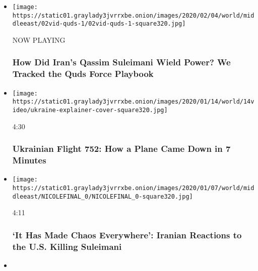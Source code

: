 \begin{itemize}
\item
  \texttt{[image: https://static01.graylady3jvrrxbe.onion/images/2020/02/04/world/middleeast/02vid-quds-1/02vid-quds-1-square320.jpg]}

  NOW PLAYING

  \hypertarget{how-did-irans-qassim-suleimani-wield-power-we-tracked-the-quds-force-playbook-2}{%
  \subsubsection{How Did Iran's Qassim Suleimani Wield Power? We Tracked
  the Quds Force
  Playbook}\label{how-did-irans-qassim-suleimani-wield-power-we-tracked-the-quds-force-playbook-2}}
\item
  \href{https://www.nytimes3xbfgragh.onion/video/world/middleeast/100000006911696/iran-crash.html?action=click\&module=video-series-bar\&region=header\&pgtype=Article\&playlistId=video/us-iran-relations}{}

  \texttt{[image: https://static01.graylady3jvrrxbe.onion/images/2020/01/14/world/14video/ukraine-explainer-cover-square320.jpg]}

  4:30

  \hypertarget{ukrainian-flight-752-how-a-plane-came-down-in-7-minutes}{%
  \subsubsection{Ukrainian Flight 752: How a Plane Came Down in 7
  Minutes}\label{ukrainian-flight-752-how-a-plane-came-down-in-7-minutes}}
\item
  \href{https://www.nytimes3xbfgragh.onion/video/world/middleeast/100000006907637/iranian-people-soleimani-reactions.html?action=click\&module=video-series-bar\&region=header\&pgtype=Article\&playlistId=video/us-iran-relations}{}

  \texttt{[image: https://static01.graylady3jvrrxbe.onion/images/2020/01/07/world/middleeast/NICOLEFINAL\_0/NICOLEFINAL\_0-square320.jpg]}

  4:11

  \hypertarget{it-has-made-chaos-everywhere-iranian-reactions-to-the-us-killing-suleimani}{%
  \subsubsection{`It Has Made Chaos Everywhere': Iranian Reactions to
  the U.S. Killing
  Suleimani}\label{it-has-made-chaos-everywhere-iranian-reactions-to-the-us-killing-suleimani}}
\item
  \href{https://www.nytimes3xbfgragh.onion/video/world/middleeast/100000006911815/iran-plane-missile.html?action=click\&module=video-series-bar\&region=header\&pgtype=Article\&playlistId=video/us-iran-relations}{}


\end{itemize}
